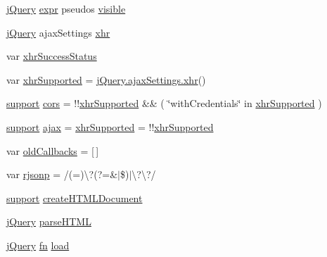 \begin{DoxyCompactItemize}
\item 
\hyperlink{jquery-3_82_81_8js_a609525712f1102566c2b03866ceb2bba}{j\+Query} \hyperlink{jquery-3_82_81_8js_aaacd1d5b3593ba4dfff6d67d4f6cfda1}{expr} pseudos \hyperlink{jquery-3_82_81_8js_ad2847a0ef6a0103600626ff918a856ca}{visible}
\item 
\hyperlink{jquery-3_82_81_8js_a609525712f1102566c2b03866ceb2bba}{j\+Query} ajax\+Settings \hyperlink{jquery-3_82_81_8js_a0b7a5cb538ca9913b1b3b1c807ad06f0}{xhr}
\item 
var \hyperlink{jquery-3_82_81_8js_a4762d0058cff27281fe6b01713853fe1}{xhr\+Success\+Status}
\item 
var \hyperlink{jquery-3_82_81_8js_a23a202c1c84174aae35f44efee37ed43}{xhr\+Supported} = \hyperlink{jquery-3_82_81_8js_a0b7a5cb538ca9913b1b3b1c807ad06f0}{j\+Query.\+ajax\+Settings.\+xhr}()
\item 
\hyperlink{jquery-3_82_81_8js_ab166c89ccabddfd7c423a7fcb23ca84f}{support} \hyperlink{jquery-3_82_81_8js_a8d50fb3dc42e0b26d2ed6ba1db947725}{cors} = !!\hyperlink{jquery-3_82_81_8js_a23a202c1c84174aae35f44efee37ed43}{xhr\+Supported} \&\& ( \char`\"{}with\+Credentials\char`\"{} in \hyperlink{jquery-3_82_81_8js_a23a202c1c84174aae35f44efee37ed43}{xhr\+Supported} )
\item 
\hyperlink{jquery-3_82_81_8js_ab166c89ccabddfd7c423a7fcb23ca84f}{support} \hyperlink{jquery-3_82_81_8js_af45afceed06e4a3422005112719633dd}{ajax} = \hyperlink{jquery-3_82_81_8js_a23a202c1c84174aae35f44efee37ed43}{xhr\+Supported} = !!\hyperlink{jquery-3_82_81_8js_a23a202c1c84174aae35f44efee37ed43}{xhr\+Supported}
\item 
var \hyperlink{jquery-3_82_81_8js_ae46a2ee65a3f347972462f869c9d4960}{old\+Callbacks} = \mbox{[}$\,$\mbox{]}
\item 
var \hyperlink{jquery-3_82_81_8js_a8b62e46075611fd1fc0bbb78b14d113a}{rjsonp} = /(=)\textbackslash{}?(?=\&$\vert$\$)$\vert$\textbackslash{}?\textbackslash{}?/
\item 
\hyperlink{jquery-3_82_81_8js_ab166c89ccabddfd7c423a7fcb23ca84f}{support} \hyperlink{jquery-3_82_81_8js_a116f377daf012bb29aa7cf96d18d3af0}{create\+H\+T\+M\+L\+Document}
\item 
\hyperlink{jquery-3_82_81_8js_a609525712f1102566c2b03866ceb2bba}{j\+Query} \hyperlink{jquery-3_82_81_8js_a09aeded1ab567632f194acd1550eac88}{parse\+H\+T\+ML}
\item 
\hyperlink{jquery-3_82_81_8js_a609525712f1102566c2b03866ceb2bba}{j\+Query} \hyperlink{jquery-3_82_81_8js_acef6bdaf6b9b20fdcca1ea86f0902c3b}{fn} \hyperlink{jquery-3_82_81_8js_a8d0b9ec82c308161432f1c387d2fc2a7}{load}

\end{DoxyCompactItemize}
